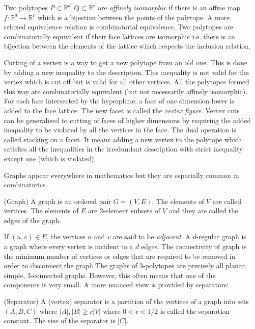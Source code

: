 Two polytopes $P\subset \mathbb{R}^d, Q \subset \mathbb{R}^e$ are 
\textit{affinely isomorphic} if there is an affine map $f: \mathbb{R}^d 
\rightarrow \mathbb{R}^e$ which is a bijection between the points of the 
polytope. A more relaxed equivalence relation is combinatorial equivalence. Two 
polytopes are combinatorially equivalent if their face lattices are isomorphic 
i.e. there is an bijection between the elements of the lattice which respects 
the inclusion relation. 

Cutting of a vertex is a way to get a new polytope from an old one. This is 
done by adding a new inequality to the description. This inequality is not 
valid for the vertex which is cut off but is valid for all other vertices. All 
the polytopes formed this way are combinatorially equivalent (but not 
necessarily affinely isomorphic). For each face intersected by the hyperplane, 
a face of one dimension lower is added to the face lattice. The new facet is 
called the \textit{vertex figure}. Vertex cuts can be generalized to cutting of 
faces of higher dimensions by requiring the added inequality to be violated by 
all the vertices in the face. The dual operation is called stacking on a facet. 
It means adding a new vertex to the polytope which satisfies all the 
inequalities in the irredundant description with strict inequality except one 
(which is violated).

Graphs appear everywhere in mathematics but they are especially common in 
combinatorics. 

\begin{definition}
(Graph) A graph is an ordered pair $G=(V,E)$. The elements of $V$ are called 
vertices. The elements of $E$ are 2-element subsets of $V$ and they are called 
the edges of the graph. 
\end{definition}

If $(u,v) \in E$, the vertices $u$ and $v$ are said to be \textit{adjacent}.
A $d$-regular graph is a graph where every vertex is incident to a $d$ edges.
The connectivity of graph is the minimum number of vertices or edges that are 
required to be removed in order to disconnect the graph The graphs of 
3-polytopes are precisely all planar, simple, 3-connected graphs. However, this 
often means that one of the components is very small. A more nuanced view is 
provided 
by separators:

\begin{definition}
(Separator) A (vertex) separator is a partition of the vertices of a graph into 
sets $(A,B,C)$ where $|A|, |B| \geq c|V|$ where $0<c<1/2$ is called the 
separation 
constant. The size of the separator is $|C|$.  
\end{definition}

